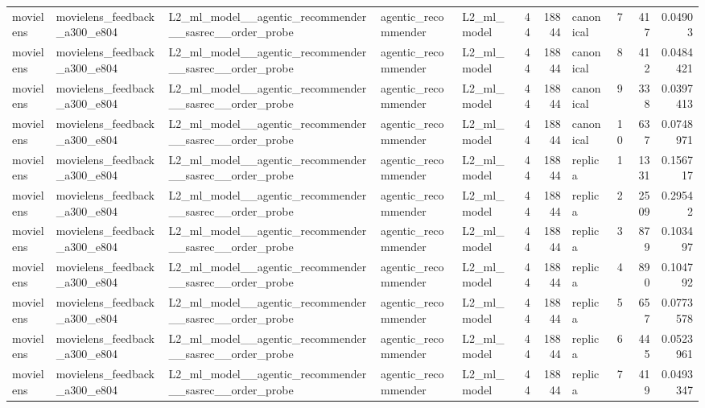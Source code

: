 \begin{table}[htbp!]
\begin{tabular}{lllllrrlrrr}
movielens & movielens\_feedback\_a300\_e804 & L2\_ml\_model\_\_agentic\_recommender\_\_sasrec\_\_order\_probe & agentic\_recommender & L2\_ml\_model & 44 & 18844 & canonical & 7 & 417 & 0.04903 \\
movielens & movielens\_feedback\_a300\_e804 & L2\_ml\_model\_\_agentic\_recommender\_\_sasrec\_\_order\_probe & agentic\_recommender & L2\_ml\_model & 44 & 18844 & canonical & 8 & 412 & 0.0484421 \\
movielens & movielens\_feedback\_a300\_e804 & L2\_ml\_model\_\_agentic\_recommender\_\_sasrec\_\_order\_probe & agentic\_recommender & L2\_ml\_model & 44 & 18844 & canonical & 9 & 338 & 0.0397413 \\
movielens & movielens\_feedback\_a300\_e804 & L2\_ml\_model\_\_agentic\_recommender\_\_sasrec\_\_order\_probe & agentic\_recommender & L2\_ml\_model & 44 & 18844 & canonical & 10 & 637 & 0.0748971 \\
movielens & movielens\_feedback\_a300\_e804 & L2\_ml\_model\_\_agentic\_recommender\_\_sasrec\_\_order\_probe & agentic\_recommender & L2\_ml\_model & 44 & 18844 & replica & 1 & 1331 & 0.156717 \\
movielens & movielens\_feedback\_a300\_e804 & L2\_ml\_model\_\_agentic\_recommender\_\_sasrec\_\_order\_probe & agentic\_recommender & L2\_ml\_model & 44 & 18844 & replica & 2 & 2509 & 0.29542 \\
movielens & movielens\_feedback\_a300\_e804 & L2\_ml\_model\_\_agentic\_recommender\_\_sasrec\_\_order\_probe & agentic\_recommender & L2\_ml\_model & 44 & 18844 & replica & 3 & 879 & 0.103497 \\
movielens & movielens\_feedback\_a300\_e804 & L2\_ml\_model\_\_agentic\_recommender\_\_sasrec\_\_order\_probe & agentic\_recommender & L2\_ml\_model & 44 & 18844 & replica & 4 & 890 & 0.104792 \\
movielens & movielens\_feedback\_a300\_e804 & L2\_ml\_model\_\_agentic\_recommender\_\_sasrec\_\_order\_probe & agentic\_recommender & L2\_ml\_model & 44 & 18844 & replica & 5 & 657 & 0.0773578 \\
movielens & movielens\_feedback\_a300\_e804 & L2\_ml\_model\_\_agentic\_recommender\_\_sasrec\_\_order\_probe & agentic\_recommender & L2\_ml\_model & 44 & 18844 & replica & 6 & 445 & 0.0523961 \\
movielens & movielens\_feedback\_a300\_e804 & L2\_ml\_model\_\_agentic\_recommender\_\_sasrec\_\_order\_probe & agentic\_recommender & L2\_ml\_model & 44 & 18844 & replica & 7 & 419 & 0.0493347 \\

\end{tabular}
\end{table}
